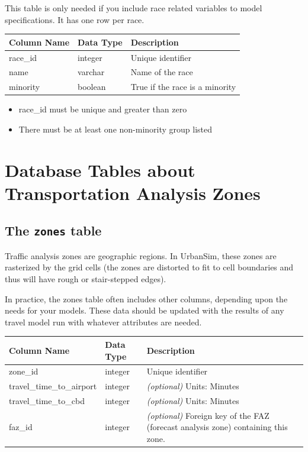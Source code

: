 This table is only needed if you include race related variables to model specifications.
It has one row per race.


\begin{tabular}{lll}
\textbf{Column Name} & \textbf{Data Type} & \textbf{Description} \\
\hline
race_id & integer & Unique identifier  \\
\hline
name & varchar & Name of the race  \\
\hline
minority & boolean & True if the race is a minority  \\
\hline

\end{tabular}

\begin{itemize} \tight
\item race_id must be unique and greater than zero
\item There must be at least one non-minority group listed

\end{itemize}






\section{Database Tables about Transportation Analysis Zones}

\subsection{The {\tt zones} table}

Traffic analysis zones are geographic regions. In UrbanSim, these zones are
rasterized by the grid cells (the zones are distorted to fit to cell boundaries
and thus will have rough or stair-stepped edges).

In practice, the zones table often includes other columns, depending upon the
needs for your models.  These data should be updated with the results of any
travel model \modelsindex run with whatever attributes are needed.

\begin{tabular}{llp{3.5in}}
\textbf{Column Name} & \textbf{Data Type} & \textbf{Description} \\
\hline zone_id & integer & Unique identifier  \\

\hline travel_time_to_airport & integer & \emph{(optional) } Units: Minutes  \\

\hline travel_time_to_cbd & integer & \emph{(optional) } Units: Minutes  \\

\hline faz_id & integer & \emph{(optional) } Foreign key of the FAZ (forecast
analysis zone) containing this zone.   \\

\hline
\end{tabular}

